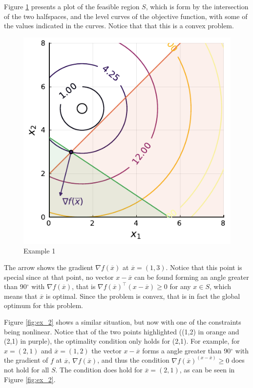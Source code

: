 Figure \ref{fig:ex_1} presents a plot of the feasible region $S$, which is form by the intersection of the two halfspaces, and the level curves of the objective function, with some of the values indicated in the curves. Notice that that this is a convex problem. 

\begin{figure}[H]
	\includegraphics{part_2/chapter_4/figures/ex1.pdf}
	\caption{Example 1}	\label{fig:ex_1}
\end{figure}

The arrow shows the gradient $\nabla f(\overline{x})$ at $\overline{x} = (1,3)$. Notice that this point is special since at that point, no vector $x - \overline{x}$ can be found forming an angle greater than 90$^\circ$ with $\nabla f(\overline{x})$, that is $\nabla f(\overline{x})^\top(x - \overline{x}) \geq 0$ for any $x \in S$, which means that $\overline{x}$ is optimal. Since the problem is convex, that is in fact the global optimum for this problem.

Figure \ref{fig:ex_2} shows a similar situation, but now with one of the constraints being nonlinear. Notice that of the two points highlighted ((1,2) in orange and (2,1) in purple), the optimality condition only holds for (2,1). For example, for $x = (2,1)$ and $\overline{x} = (1,2)$ the vector $x - \overline{x}$ forms a angle greater than 90$^\circ$ with the gradient of $f$ at $\overline{x}$, $\nabla f(\overline{x})$, and thus the condition $\nabla f(\overline{x})^(x - \overline{x}) \geq 0$ does not hold for all $S$. The condition does hold for $\overline{x} = (2,1)$, as can be seen in Figure \ref{fig:ex_2}.  

